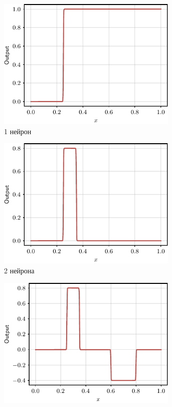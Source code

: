 \begin{figure}
    \centering
    \begin{subfigure}[b]{0.32\textwidth}
    \includegraphics[width=0.95\textwidth]{images/step_function.pdf}
    \caption{1 нейрон}
    \label{fig:step_function}
    \end{subfigure}
    \hfill
    \begin{subfigure}[b]{0.32\textwidth}
    \includegraphics[width=0.95\textwidth]{images/bin.pdf}
    \caption{2 нейрона}
    \label{fig:bin_function}
    \end{subfigure}
    \begin{subfigure}[b]{0.32\textwidth}
    \includegraphics[width=0.95\textwidth]{images/bin_2.pdf}

\end{subfigure}
\end{figure}
